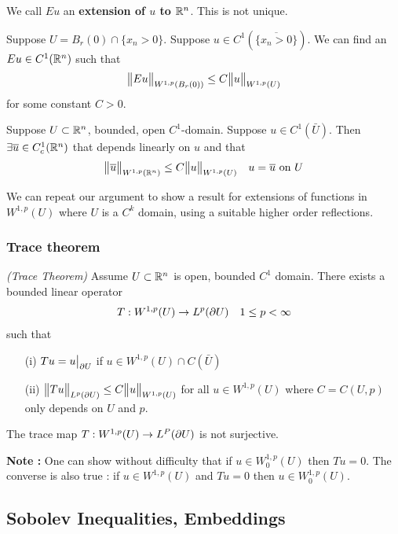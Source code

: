 \documentclass[10pt,a4paper]{report}
\begin{document}
We call $Eu$ an \textbf{extension of $u$ to $\mathbb{R}^n$}. This is not unique.
\s

\lem Suppose $U = B_r(0) \cap \{x_n >0 \}$.  Suppose $u \in C^1( \overline{\{x_n>0 \}})$. We can find an $Eu \in C^1(\mathbb{R}^n)$ such that
\begin{align*}
\bigl\lVert Eu\bigr\rVert_{W^{1,p}(B_r(0))} \leq C \bigl\lVert u\bigr\rVert_{W^{1,p}(U)}
\end{align*}
for some constant $C>0$.
\s

\lem Suppose $U\subset \mathbb{R}^n$, bounded, open $C^1$-domain. Suppose $u\in C^1 (\bar{U})$. Then $\exists \overline{u} \in C^1_c(\mathbb{R}^n)$ that depends linearly on $u$ and that
\begin{align*}
\bigl\lVert\overline{u}\bigr\rVert_{W^{1,p}(\mathbb{R}^n)} \leq C \bigl\lVert u\bigr\rVert_{W^{1,p}(U)} \quad u= \overline{u} \text{ on } U
\end{align*}
\s

We can repeat our argument to show a result for extensions of functions in $W^{1,p}(U)$ where $U$ is a $C^k$ domain, using a suitable higher order reflections.
\s

\subsubsection*{Trace theorem}

\thm \emph{(Trace Theorem)} Assume $U\subset \mathbb{R}^n$ is open, bounded $C^1$ domain. There exists a bounded linear operator
\begin{align*}
T : W^{1,p}(U) \rightarrow L^p(\partial U) \quad 1\leq p <\infty
\end{align*}
such that
\begin{itemize}
\item[(i)] $Tu = u \big|_{\partial U}$ if $u \in W^{1,p}(U) \cap C(\bar{U})$
\item[(ii)] $\bigl\lVert Tu\bigr\rVert_{L^p(\partial U)} \leq C\bigl\lVert u\bigr\rVert_{W^{1,p}(U)}$ for all $u\in W^{1,p}(U)$ where $C = C(U,p)$ only depends on $U$ and $p$.
\end{itemize}
\s

The trace map $T : W^{1, p}(U)\rightarrow L^P(\partial U)$ is not surjective. 
\s

\textbf{Note :} One can show without difficulty that if $u \in W_0^{1,p}(U)$ then $Tu=0$. The converse is also true : if $u\in W^{1,p}(U)$ and $Tu =0$ then $u \in W_0^{1,p}(U)$.

\subsection*{Sobolev Inequalities, Embeddings}
\end{document}
